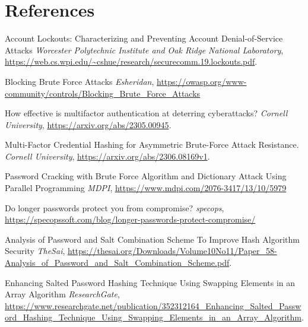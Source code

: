 \documentclass{comjnl}
\begin{document}
\section{References}
\begin{thebibliography}{99}

   Account Lockouts: Characterizing and Preventing Account Denial-of-Service Attacks
  \textit{Worcester Polytechnic Institute and Oak Ridge National Laboratory}, \url{https://web.cs.wpi.edu/~cshue/research/securecomm.19.lockouts.pdf}.

   Blocking Brute Force Attacks
  \textit{Esheridan}, \url{https://owasp.org/www-community/controls/Blocking_Brute_Force_Attacks}

   How effective is multifactor authentication at deterring cyberattacks? 
  \textit{Cornell University}, \url{https://arxiv.org/abs/2305.00945}.
  
   Multi-Factor Credential Hashing for Asymmetric Brute-Force Attack Resistance.
  \textit{Cornell University}, \url{https://arxiv.org/abs/2306.08169v1}.

   Password Cracking with Brute Force Algorithm and Dictionary Attack Using Parallel Programming
  \textit{MDPI}, \url {https://www.mdpi.com/2076-3417/13/10/5979}

   Do longer passwords protect you from compromise?
  \textit{specops}, \url {https://specopssoft.com/blog/longer-passwords-protect-compromise/}

   Analysis of Password and Salt Combination Scheme To Improve Hash Algorithm Security
  \textit{TheSai}, \url{https://thesai.org/Downloads/Volume10No11/Paper_58-Analysis_of_Password_and_Salt_Combination_Scheme.pdf}.

   Enhancing Salted Password Hashing Technique Using Swapping Elements in an Array Algorithm
  \textit{ResearchGate}, \url{https://www.researchgate.net/publication/352312164_Enhancing_Salted_Password_Hashing_Technique_Using_Swapping_Elements_in_an_Array_Algorithm}.
  
\end{thebibliography}




\end{document}
